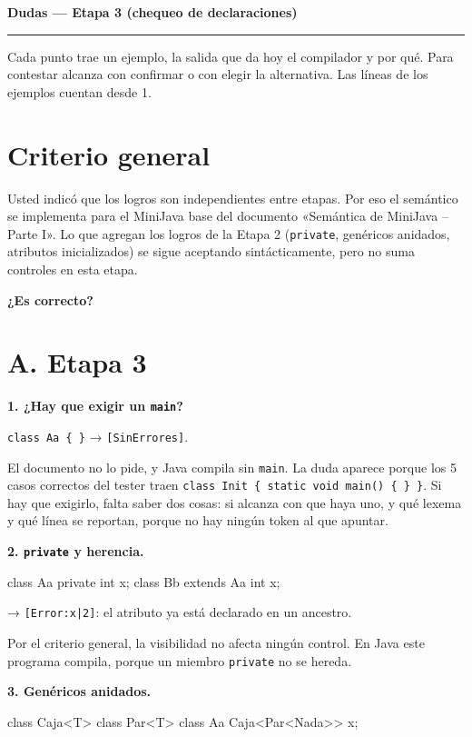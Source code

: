 \documentclass[12pt,a4paper]{article}
\newcommand{\cod}[1]{\texttt{#1}}
\newcommand{\pregunta}[1]{\par\medskip\needspace{4\baselineskip}\noindent\textbf{#1}\par\smallskip}
\begin{document}
\thispagestyle{fancy}
\raggedright

{\LARGE\bfseries Dudas --- Etapa 3 (chequeo de declaraciones)\par}
\smallskip
{\color{tinta}\rule{\textwidth}{0.6pt}}
\medskip

Cada punto trae un ejemplo, la salida que da hoy el compilador y por qué. Para contestar alcanza
con confirmar o con elegir la alternativa. Las líneas de los ejemplos cuentan desde 1.

\section*{Criterio general}

Usted indicó que los logros son independientes entre etapas. Por eso el semántico se implementa
para el MiniJava base del documento «Semántica de MiniJava – Parte I». Lo que agregan los logros
de la Etapa 2 (\cod{private}, genéricos anidados, atributos inicializados) se sigue aceptando
sintácticamente, pero no suma controles en esta etapa.

\textbf{¿Es correcto?}

\section*{A. Etapa 3}

\pregunta{1. ¿Hay que exigir un \cod{main}?}

\cod{class Aa \{ \}} → \cod{[SinErrores]}.

El documento no lo pide, y Java compila sin \cod{main}. La duda aparece porque los 5 casos
correctos del tester traen \cod{class Init \{ static void main() \{ \} \}}. Si hay que exigirlo,
falta saber dos cosas: si alcanza con que haya uno, y qué lexema y qué línea se reportan, porque
no hay ningún token al que apuntar.

\pregunta{2. \cod{private} y herencia.}

\begin{fuente}
class Aa { private int x; }
class Bb extends Aa { int x; }
\end{fuente}

→ \cod{[Error:x|2]}: el atributo ya está declarado en un ancestro.

Por el criterio general, la visibilidad no afecta ningún control. En Java este programa compila,
porque un miembro \cod{private} no se hereda.

\pregunta{3. Genéricos anidados.}

\begin{fuente}
class Caja<T> { }
class Par<T> { }
class Aa { Caja<Par<Nada>> x; }
\end{fuente}
\end{document}
